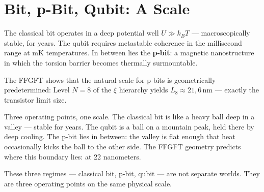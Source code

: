 \section{Bit, p-Bit, Qubit: A Scale}

The classical bit operates in a deep potential well $U \gg k_B T$ ---
macroscopically stable, for years. The qubit requires metastable coherence
in the millisecond range at mK temperatures. In between lies the
\textbf{p-bit}: a magnetic nanostructure in which the torsion barrier
becomes thermally surmountable.

The FFGFT shows that the natural scale for p-bits is geometrically
predetermined: Level $N = 8$ of the $\xi$ hierarchy yields
$L_8 \approx 21{,}6\,\text{nm}$ --- exactly the transistor limit size. 

\begin{laierspur}
Three operating points, one scale. The classical bit is like a heavy
ball deep in a valley --- stable for years. The qubit is a ball
on a mountain peak, held there by deep cooling.
The p-bit lies in between: the valley is flat enough that heat occasionally
kicks the ball to the other side. The FFGFT geometry predicts
where this boundary lies: at 22 nanometers.
\end{laierspur}

These three regimes --- classical bit, p-bit, qubit --- are not
separate worlds. They are three operating points on the same physical
scale. 